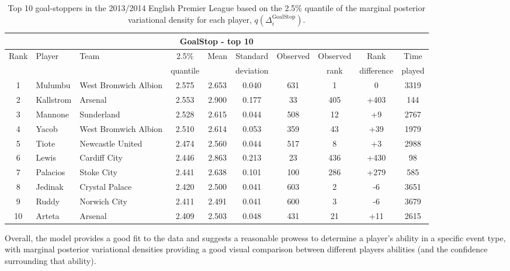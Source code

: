 \documentclass[11pt,a4paper]{article}
\begin{document}
\begin{table}%
\caption{Top 10 goal-stoppers in the 2013/2014 English Premier League based on the 2.5\% quantile of the marginal posterior variational density for each player, $q(\Delta_i^{\textrm{GoalStop}})$.} \label{tablegoalstop}
\centering
\footnotesize
\begin{tabular}{cllccccccc}
\hline
\multicolumn{10}{c}{GoalStop - top 10}\\
\hline
\multirow{2}{*}{Rank} & \multirow{2}{*}{Player} &  \multirow{2}{*}{Team} & 2.5\% & \multirow{2}{*}{Mean} & Standard & \multirow{2}{*}{Observed} & Observed & Rank & Time\\
 &  &  & quantile & & deviation &  & rank & difference & played \\
\hline
1 & Mulumbu & West Bromwich Albion &	2.575 & 2.653 &	0.040  & 	631	  & 1 & 0 & 3319\\
2 & Kallstrom & Arsenal &	2.553   & 2.900 &	0.177  & 	33	    & 405 & +403 & 144 \\
3 & Mannone & Sunderland &	2.528 	  & 2.615 &	0.044  & 	508	    & 12 & +9 & 2767  \\
4 & Yacob  & West Bromwich Albion &	2.510 	& 2.614 &	0.053  &	359	  & 43 & +39 & 1979 \\
5 & Tiote  & Newcastle United &	2.474   & 2.560 &	0.044  & 	517	    & 8 & +3 & 2988 \\
6 & Lewis & Cardiff City	 &	2.446 	  & 2.863 &	0.213  & 	23	    & 436 & +430 & 98 \\
7 & Palacios & Stoke City &	2.441 &	2.638 &	0.101  &	100	    & 286 & +279 & 585 \\
8 & Jedinak & Crystal Palace &	2.420 	  & 2.500 &	0.041  & 	603	    & 2 & -6 &  3651 \\
9 & Ruddy &	Norwich City &	2.411 	  & 2.491 &	0.041  & 	600	    & 3 & -6 &  3679\\
10 & Arteta &	Arsenal & 	2.409 &	2.503 &	0.048  & 	431	  & 21 & +11 & 2615 \\
\hline
\end{tabular}
\end{table}

\newpage
Overall, the model provides a good fit to the data and suggests 
a reasonable prowess to determine a player's ability in a specific 
event type, with marginal posterior variational densities providing a 
good visual comparison between different players abilities (and the 
confidence surrounding that ability). 
\end{document}
